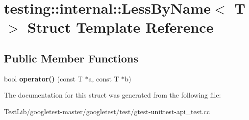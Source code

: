 \hypertarget{structtesting_1_1internal_1_1LessByName}{}\section{testing\+:\+:internal\+:\+:Less\+By\+Name$<$ T $>$ Struct Template Reference}
\label{structtesting_1_1internal_1_1LessByName}
\subsection*{Public Member Functions}
\begin{DoxyCompactItemize}
\item 
\mbox{\label{structtesting_1_1internal_1_1LessByName_a62386ac7750bfc035536be55d90a52eb}} 
bool {\bfseries operator()} (const T $\ast$a, const T $\ast$b)
\end{DoxyCompactItemize}


The documentation for this struct was generated from the following file\+:\begin{DoxyCompactItemize}
\item 
Test\+Lib/googletest-\/master/googletest/test/gtest-\/unittest-\/api\+\_\+test.\+cc\end{DoxyCompactItemize}
